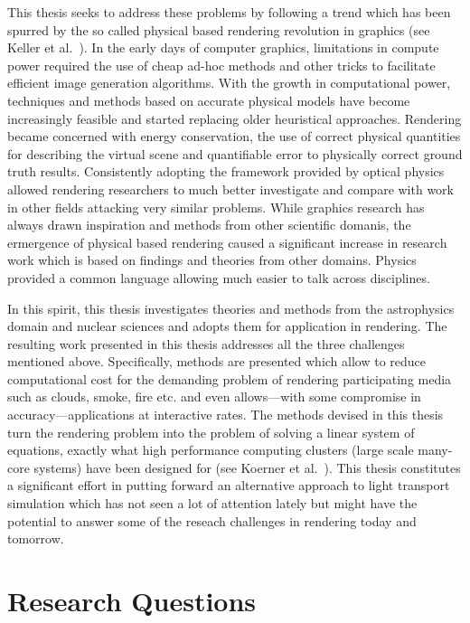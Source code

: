 This thesis seeks to address these problems by following a trend which has been spurred by the so called physical based rendering revolution in graphics (see Keller et al.~\cite{Keller15}). In the early days of computer graphics, limitations in compute power required the use of cheap ad-hoc methods and other tricks to facilitate efficient image generation algorithms. With the growth in computational power, techniques and methods based on accurate physical models have become increasingly feasible and started replacing older heuristical approaches. Rendering became concerned with energy conservation, the use of correct physical quantities for describing the virtual scene and quantifiable error to physically correct ground truth results. Consistently adopting the framework provided by optical physics allowed rendering researchers to much better investigate and compare with work in other fields attacking very similar problems. While graphics research has always drawn inspiration and methods from other scientific domanis, the ermergence of physical based rendering caused a significant increase in research work which is based on findings and theories from other domains. Physics provided a common language allowing much easier to talk across disciplines.

In this spirit, this thesis investigates theories and methods from the astrophysics domain and nuclear sciences and adopts them for application in rendering. The resulting work presented in this thesis addresses all the three challenges mentioned above. Specifically, methods are presented which allow to reduce computational cost for the demanding problem of rendering participating media such as clouds, smoke, fire etc. and even allows---with some compromise in accuracy---applications at interactive rates. The methods devised in this thesis turn the rendering problem into the problem of solving a linear system of equations, exactly what high performance computing clusters (large scale many-core systems) have been designed for (see Koerner et al.~\cite{Koerner17}). This thesis constitutes a significant effort in putting forward an alternative approach to light transport simulation which has not seen a lot of attention lately but might have the potential to answer some of the reseach challenges in rendering today and tomorrow.


\section{Research Questions}

